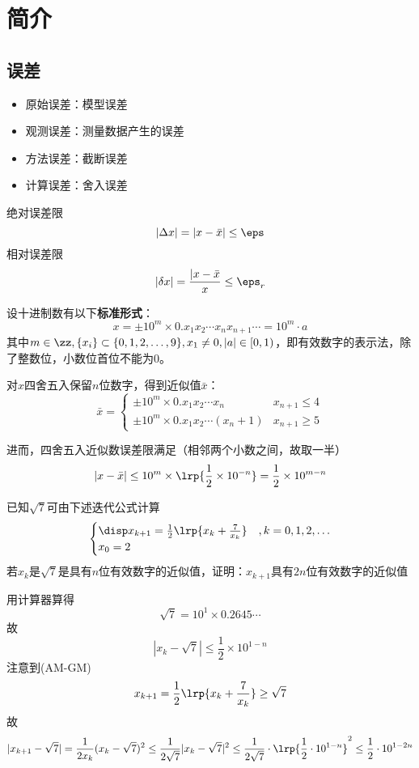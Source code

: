 
\section{简介}
\subsection{误差}
\begin{itemize}
	\item 原始误差：模型误差
	\item 观测误差：测量数据产生的误差
	\item 方法误差：截断误差
	\item 计算误差：舍入误差
\end{itemize}

\begin{definition}[误差限]
	绝对误差限
	\[|\Delta x|=|x-\bar{x}|\leq\eps\]
	相对误差限
	\[|\delta x|=\frac{|x-\bar{x}}{x}\leq \eps_r\]
\end{definition}

设十进制数有以下\textbf{标准形式}：
\[x=\pm 10^m\times 0.x_1 x_2\cdots x_n x_{n+1}\cdots=10^m\cdot a\]
其中$m\in\zz,\{x_i\}\subset\{0,1,2,\ldots,9\},x_1\ne 0,|a|\in[0,1)$，即有效数字的表示法，除了整数位，小数位首位不能为$0$。

对$x$四舍五入保留$n$位数字，得到近似值$\bar{x}$：
\[\bar{x}=\begin{cases}
	\pm 10^m\times 0.x_1 x_2\cdots x_n & x_{n+1}\leq 4\\
	\pm 10^m\times 0.x_1 x_2\cdots (x_n+1) & x_{n+1}\geq 5
\end{cases}\]

进而，四舍五入近似数误差限满足（相邻两个小数之间，故取一半）
\[|x-\bar{x}|\leq 10^m\times\lrp{\frac{1}{2}\times 10^{-n}}=\frac{1}{2}\times 10^{m-n}\]

\begin{example}
	已知$\sqrt{7}$可由下述迭代公式计算
	\[\begin{cases}
		\disp x_{k+1}=\frac{1}{2}\lrp{x_k+\frac{7}{x_k}} & ,k=0,1,2,\ldots\\
		x_0=2
	\end{cases}\]
	若$x_k$是$\sqrt{7}$是具有$n$位有效数字的近似值，证明：$x_{k+1}$具有$2n$位有效数字的近似值
\end{example}
\begin{analysis}
	用计算器算得
	\[\sqrt{7}=10^1\times 0.2645\cdots\]
	故
	\[|x_k-\sqrt{7}|\leq\frac{1}{2}\times 10^{1-n}\]
	注意到(AM-GM)
	\[x_{k+1}=\frac{1}{2}\lrp{x_k+\frac{7}{x_k}}\geq\sqrt{7}\]
	故
	\[|x_{k+1}-\sqrt{7}|=\frac{1}{2x_k}(x_k-\sqrt{7})^2\leq\frac{1}{2\sqrt{7}}|x_k-\sqrt{7}|^2\leq \frac{1}{2\sqrt{7}}\cdot\lrp{\frac{1}{2}\cdot 10^{1-n}}^2\leq\frac{1}{2}\cdot 10^{1-2n}\]
\end{analysis}

